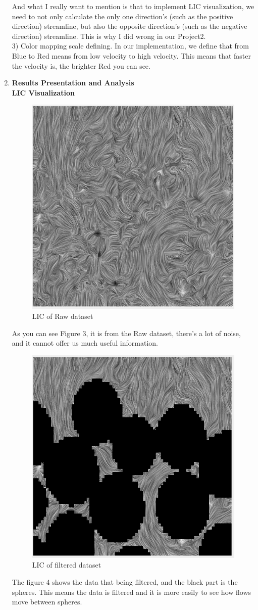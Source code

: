 \documentclass[letterpaper,12pt,titlepage,fleqn]{article}
\begin{document}
\begin{CJK}{UTF8}{gkai}
\begin{enumerate}
And what I really want to mention is that to implement LIC visualization, we need to not only calculate the only one direction’s (such as the positive direction) streamline, but also the opposite direction’s (such as the negative direction) streamline. This is why I did wrong in our Project2.\\

3) Color mapping scale defining. In our implementation, we define that from Blue to Red means from low velocity to high velocity. This means that faster the velocity is, the brighter Red you can see.

\item \textbf{Results Presentation and Analysis}\\
\textbf{LIC Visualization}\\
\begin{figure}[htbp]
	\centering
	\includegraphics[width=0.4\linewidth]{image/raw8.png}
		\caption{LIC of Raw dataset}
\end{figure}
As you can see Figure 3, it is from the Raw dataset, there's a lot of noise, and it cannot offer us much useful information.\\
\begin{figure}[htbp]
	\centering
	\includegraphics[width=0.4\linewidth]{image/v8.png}
		\caption{LIC of filtered dataset}
\end{figure}
The figure 4 shows the data that being filtered, and the black part is the spheres. This means the data is filtered and it is more easily to see how flows move between spheres. \\

\end{enumerate}
\end{CJK}
\end{document}

